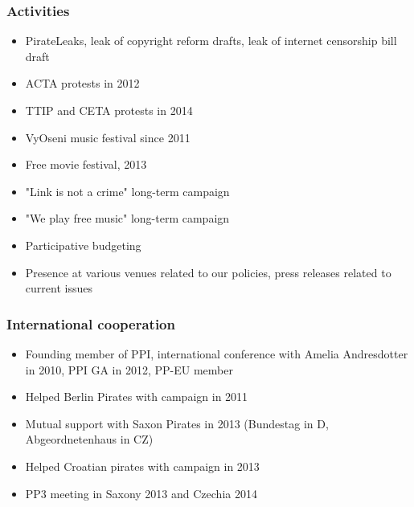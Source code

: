\begin{frame}
	\frametitle{Activities}
	\begin{itemize}
		\item PirateLeaks, leak of copyright reform drafts, leak of internet censorship bill draft
		\item ACTA protests in 2012
		\item TTIP and CETA protests in 2014
		\item VyOseni music festival since 2011
		\item Free movie festival, 2013
		\item "Link is not a crime" long-term campaign
		\item "We play free music" long-term campaign
		\item Participative budgeting
		\item Presence at various venues related to our policies, press releases related to current issues

	\end{itemize}
\end{frame}

\begin{frame}
	\frametitle{International cooperation}
	\begin{itemize}
		\item Founding member of PPI, international conference with Amelia Andresdotter in 2010, PPI GA in 2012, PP-EU member
		\item Helped Berlin Pirates with campaign in 2011
		\item Mutual support with Saxon Pirates in 2013 (Bundestag in D, Abgeordnetenhaus in CZ)
		\item Helped Croatian pirates with campaign in 2013
		\item PP3 meeting in Saxony 2013 and Czechia 2014
	\end{itemize}
\end{frame}
